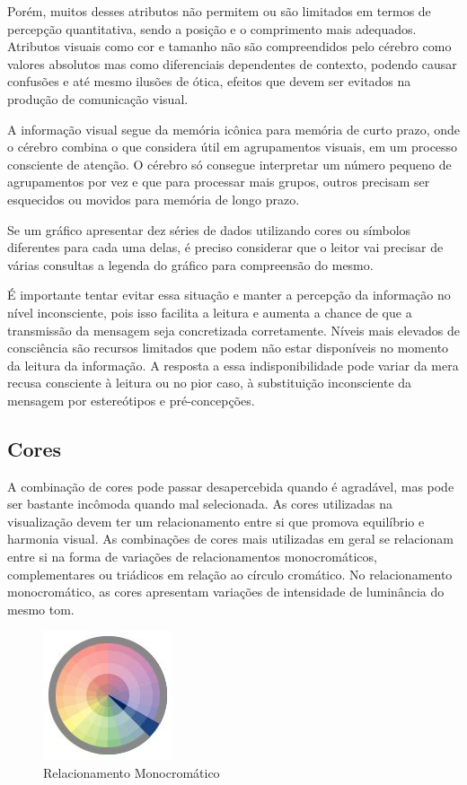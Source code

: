\documentclass[]{article}
\begin{document}
Porém, muitos desses atributos não permitem ou são limitados em termos de percepção quantitativa, sendo a posição e o comprimento mais adequados. Atributos visuais como cor e tamanho não são compreendidos pelo cérebro como valores absolutos mas como diferenciais dependentes de contexto, podendo causar confusões e até mesmo ilusões de ótica, efeitos que devem ser evitados na produção de comunicação visual.

A informação visual segue da memória icônica para memória de curto prazo, onde o cérebro combina o que considera útil em agrupamentos visuais, em um processo consciente de atenção. O cérebro só consegue interpretar um número pequeno de agrupamentos por vez e que para processar mais grupos, outros precisam ser esquecidos ou movidos para memória de longo prazo. 

Se um gráfico apresentar dez séries de dados utilizando cores ou símbolos diferentes para cada uma delas, é preciso considerar que o leitor vai precisar de várias consultas a legenda do gráfico para compreensão do mesmo.

É importante tentar evitar essa situação e manter a percepção da informação no nível inconsciente, pois isso facilita a leitura e aumenta a chance de que a transmissão da mensagem seja concretizada corretamente. Níveis mais elevados de consciência são recursos limitados que podem não estar disponíveis no momento da leitura da informação. A resposta a essa indisponibilidade pode variar da mera recusa consciente à leitura ou no pior caso, à substituição inconsciente da mensagem por estereótipos e pré-concepções. \cite{baumeister2011willpower}

\subsection{Cores}

A combinação de cores pode passar desapercebida quando é agradável, mas pode ser bastante incômoda quando mal selecionada. As cores utilizadas na visualização devem ter um relacionamento entre si que promova equilíbrio e harmonia visual. \cite{worqx:Online}
As combinações de cores mais utilizadas em geral se relacionam entre si na forma de variações de relacionamentos monocromáticos, complementares ou triádicos em relação ao círculo cromático.
No relacionamento monocromático, as cores apresentam variações de intensidade de luminância do mesmo tom.

\begin{figure}[!ht]
\centering
\includegraphics[scale=.7]{./monocromatic_template}
\caption[]{Relacionamento Monocromático}
\label{fig:monocromatic_template}
\end{figure}
\end{document}
